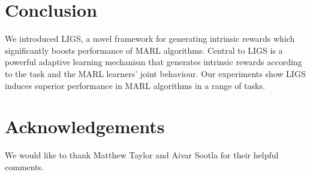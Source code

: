 \documentclass{article}
\begin{document}


\vspace{-2mm}
\section{Conclusion}

We introduced LIGS, a novel framework for generating intrinsic rewards which significantly boosts performance of MARL algorithms. Central to LIGS is a powerful adaptive learning mechanism that generates intrinsic rewards according to the task and the MARL learners' joint behaviour. 
% 
% 
Our experiments show LIGS induces superior performance in MARL algorithms in a range of tasks.

\section{Acknowledgements}
We would like to thank Matthew Taylor and Aivar Sootla for their helpful comments. 
\end{document}
